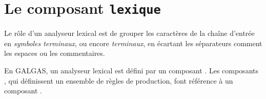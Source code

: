 
\chapter{Le composant \texttt{lexique}}

Le rôle d'un analyseur lexical est de grouper les caractères de la chaîne d'entrée en \emph{symboles terminaux}, ou encore \emph{terminaux}, en écartant les séparateurs comment les espaces ou les commentaires. 

En GALGAS, un analyseur lexical est défini par un composant . Les composants , qui définissent un ensemble de règles de production, font référence à un composant .


\newcommand\keywordsStyle[1]{\textcolor{blue}{\textbf{#1}}}
\newcommand\delimitersStyle[1]{\textcolor{brown}{#1}}
\newcommand\integerStyle[1]{#1}
\newcommand\stringStyle[1]{\textcolor{gray}{#1}}
\newcommand\attributeStyle[1]{\textcolor{pink}{#1}}

